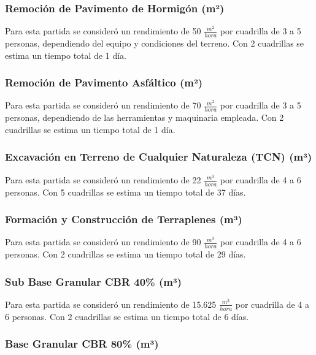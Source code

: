 \documentclass{article} %
\begin{document}
\subsubsection{Remoción de Pavimento de Hormigón (m²)}

Para esta partida se consideró un rendimiento de 50 $\frac{m^2}{hora}$ por cuadrilla de 3 a 5 personas, dependiendo del equipo y condiciones del terreno. Con 2 cuadrillas se estima un tiempo total de 1 día.

\subsubsection{Remoción de Pavimento Asfáltico (m²)}

Para esta partida se consideró un rendimiento de 70 $\frac{m^2}{hora}$ por cuadrilla de 3 a 5 personas, dependiendo de las herramientas y maquinaria empleada. Con 2 cuadrillas se estima un tiempo total de 1 día.

\subsubsection{Excavación en Terreno de Cualquier Naturaleza (TCN) (m³)}

Para esta partida se consideró un rendimiento de 22 $\frac{m^3}{hora}$ por cuadrilla de 4 a 6 personas. Con 5 cuadrillas se estima un tiempo total de 37 días.

\subsubsection{Formación y Construcción de Terraplenes (m³)}

Para esta partida se consideró un rendimiento de 90 $\frac{m^3}{hora}$ por cuadrilla de 4 a 6 personas. Con 2 cuadrillas se estima un tiempo total de 29 días.

\subsubsection{Sub Base Granular CBR 40\% (m³)}

Para esta partida se consideró un rendimiento de 15.625 $\frac{m^3}{hora}$ por cuadrilla de 4 a 6 personas. Con 2 cuadrillas se estima un tiempo total de 6 días.

\subsubsection{Base Granular CBR 80\% (m³)}
\end{document}
